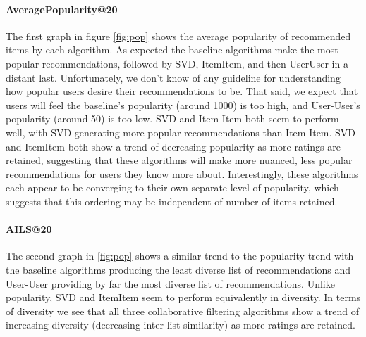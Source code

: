 \documentclass[letterpaper]{sig-alternate}
\begin{document}
  \paragraph{AveragePopularity@20}
  The first graph in figure \ref{fig:pop} shows the average popularity of recommended items by each algorithm.
  As expected the baseline algorithms make the most popular recommendations, followed by SVD, ItemItem, and then UserUser in a distant last.
  Unfortunately, we don't know of any guideline for understanding how popular users desire their recommendations to be.
  That said, we expect that users will feel the baseline's popularity (around 1000) is too high, and User-User's popularity (around 50) is too low.
  SVD and Item-Item both seem to perform well, with SVD generating more popular recommendations than Item-Item.
  SVD and ItemItem both show a trend of decreasing popularity as more ratings are retained, suggesting that these algorithms will make more nuanced, less popular recommendations for users they know more about.
  Interestingly, these algorithms each appear to be converging to their own separate level of popularity, which suggests that this ordering may be independent of number of items retained.

  \paragraph{AILS@20}
  The second graph in \ref{fig:pop} shows a similar trend to the popularity trend with the baseline algorithms producing the least diverse list of recommendations and User-User providing by far the most diverse list of recommendations.
  Unlike popularity, SVD and ItemItem seem to perform equivalently in diversity.
  In terms of diversity we see that all three collaborative filtering algorithms show a trend of increasing diversity (decreasing  inter-list similarity) as more ratings are retained.

\end{document}
